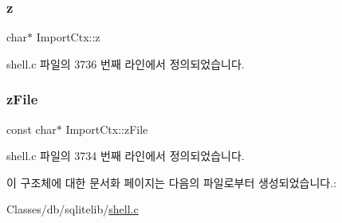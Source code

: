 \mbox{\label{struct_import_ctx_ade5d138b0f146f8bed3e83bfbb450f2e}} 
\subsubsection{\texorpdfstring{z}{z}}
{\footnotesize\ttfamily char$\ast$ Import\+Ctx\+::z}



shell.\+c 파일의 3736 번째 라인에서 정의되었습니다.

\mbox{\label{struct_import_ctx_a88414dab6838f62acc8dbb3d2afe299d}} 
\subsubsection{\texorpdfstring{z\+File}{zFile}}
{\footnotesize\ttfamily const char$\ast$ Import\+Ctx\+::z\+File}



shell.\+c 파일의 3734 번째 라인에서 정의되었습니다.



이 구조체에 대한 문서화 페이지는 다음의 파일로부터 생성되었습니다.\+:\begin{DoxyCompactItemize}
\item 
Classes/db/sqlitelib/\hyperlink{shell_8c}{shell.\+c}\end{DoxyCompactItemize}
